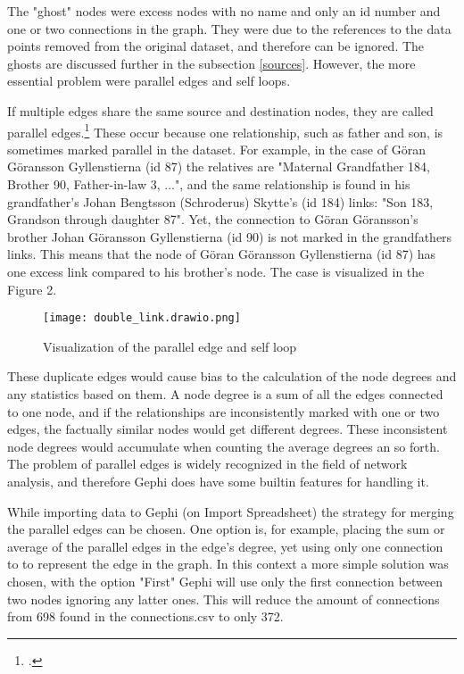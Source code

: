 The "ghost" nodes were excess nodes with no name and only an id number and one or two connections in the graph. They were due to the references to the data points removed from the original dataset, and therefore can be ignored. The ghosts are discussed further in the subsection \ref{sources}. However, the more essential problem were parallel edges and self loops.

If multiple edges share the same source and destination nodes, they are called parallel edges.\footcite[pp. 14-15.]{RajPM2018} These occur because one relationship, such as father and son, is sometimes marked parallel in the dataset. For example, in the case of Göran Göransson Gyllenstierna (id 87) the relatives are "Maternal Grandfather 184, Brother 90, Father-in-law 3, ...", and the same relationship is found in his grandfather's Johan Bengtsson (Schroderus) Skytte's (id 184) links: "Son 183, Grandson through daughter 87". Yet, the connection to Göran Göransson's brother Johan Göransson Gyllenstierna (id 90) is not marked in the grandfathers links. This means that the node of Göran Göransson Gyllenstierna (id 87) has one excess link compared to his brother's node. The case is visualized in the Figure 2.

\begin{figure}[h]
	\texttt{[image: double\_link.drawio.png]}
	\centering
	\caption{Visualization of the parallel edge and self loop} 
	\centering
\end{figure}

These duplicate edges would cause bias to the calculation of the node degrees and any statistics based on them. A node degree is a sum of all the edges connected to one node, and if the relationships are inconsistently marked with one or two edges, the factually similar nodes would get different degrees. These inconsistent node degrees would accumulate when counting the average degrees an so forth. The problem of parallel edges is widely recognized in the field of network analysis, and therefore Gephi does have some builtin features for handling it.

While importing data to Gephi (on Import Spreadsheet) the strategy for merging the parallel edges can be chosen. One option is, for example, placing the sum or average of the parallel edges in the edge's degree, yet using only one connection to to represent the edge in the graph. In this context a more simple solution was chosen, with the option "First" Gephi will use only the first connection between two nodes ignoring any latter ones. This will reduce the amount of connections from 698 found in the connections.csv to only 372.

